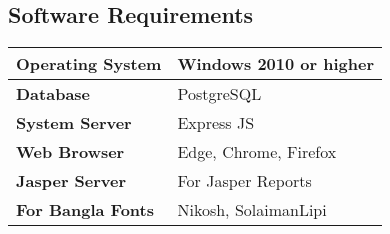 \subsection*{Software Requirements}
\begin{tabular}{|p{3.5cm}|p{3.5cm}|}
  \hline
  \textbf{Operating System} & Windows 2010 or higher \\
  \hline
  \textbf{Database} & PostgreSQL \\
  \hline
  \textbf{System Server} & Express JS \\
  \hline
  \textbf{Web Browser} & Edge, Chrome, Firefox \\
  \hline
  \textbf{Jasper Server} & For Jasper Reports \\
  \hline
  \textbf{For Bangla Fonts} & Nikosh, SolaimanLipi \\
  \hline
\end{tabular}


